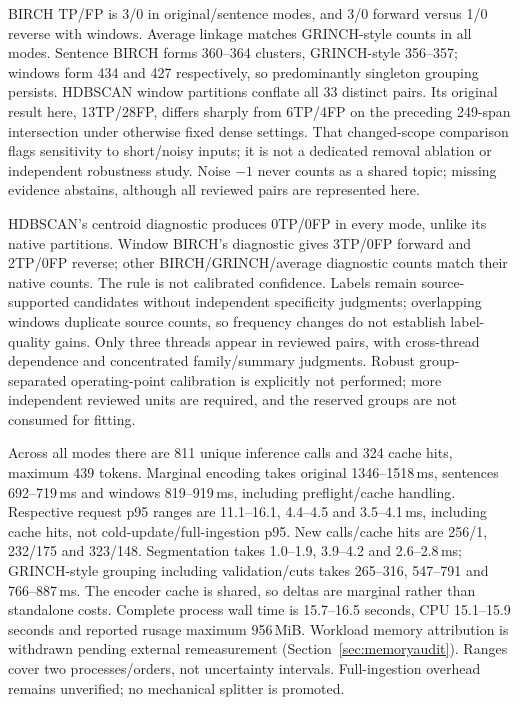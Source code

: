 \documentclass[11pt]{article}
\begin{document}
BIRCH TP/FP is 3/0 in original/sentence modes, and 3/0 forward versus 1/0
reverse with windows. Average linkage matches GRINCH-style counts in all modes.
Sentence BIRCH forms 360--364 clusters, GRINCH-style 356--357; windows form
434 and 427 respectively, so predominantly singleton grouping persists.
HDBSCAN window partitions conflate all 33 distinct pairs. Its original result
here, 13TP/28FP, differs sharply from 6TP/4FP on the preceding 249-span
intersection under otherwise fixed dense settings. That changed-scope comparison
flags sensitivity to short/noisy inputs; it is not a dedicated removal ablation
or independent robustness study. Noise $-1$ never counts as a shared topic;
missing evidence abstains, although all reviewed pairs are represented here.

HDBSCAN's centroid diagnostic produces 0TP/0FP in every mode, unlike its native
partitions. Window BIRCH's diagnostic gives 3TP/0FP forward and 2TP/0FP reverse;
other BIRCH/GRINCH/average diagnostic counts match their native counts.
The rule is not calibrated confidence. Labels remain source-supported candidates
without independent specificity judgments; overlapping windows duplicate source
counts, so frequency changes do not establish label-quality gains. Only three
threads appear in reviewed pairs, with cross-thread dependence and concentrated
family/summary judgments. Robust group-separated operating-point calibration is
explicitly not performed; more independent reviewed units are required, and the
reserved groups are not consumed for fitting.

Across all modes there are 811 unique inference calls and 324 cache hits,
maximum 439 tokens. Marginal encoding takes original 1346--1518\,ms,
sentences 692--719\,ms and windows 819--919\,ms, including preflight/cache
handling. Respective request p95 ranges are 11.1--16.1, 4.4--4.5 and
3.5--4.1\,ms, including cache hits, not cold-update/full-ingestion p95.
New calls/cache hits are 256/1, 232/175 and 323/148. Segmentation takes
1.0--1.9, 3.9--4.2 and 2.6--2.8\,ms; GRINCH-style grouping including
validation/cuts takes 265--316, 547--791 and 766--887\,ms. The encoder cache
is shared, so deltas are marginal rather than standalone costs. Complete process
wall time is 15.7--16.5 seconds, CPU 15.1--15.9 seconds and reported rusage
maximum 956\,MiB. Workload memory attribution is withdrawn pending external
remeasurement (Section~\ref{sec:memoryaudit}). Ranges cover two
processes/orders, not uncertainty intervals. Full-ingestion overhead remains
unverified; no mechanical splitter is promoted.
\end{document}
